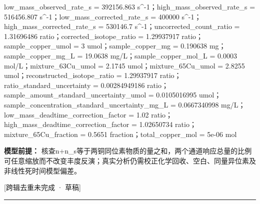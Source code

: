 \documentclass[UTF8,11pt,a4paper]{ctexart}
\begin{document}
low\_mass\_observed\_rate\_s = 392156.863 s\textasciicircum{}-1；high\_mass\_observed\_rate\_s = 516456.807 s\textasciicircum{}-1；low\_mass\_corrected\_rate\_s = 400000 s\textasciicircum{}-1；high\_mass\_corrected\_rate\_s = 530146.7 s\textasciicircum{}-1；uncorrected\_count\_ratio = 1.31696486 ratio；corrected\_isotope\_ratio = 1.29937917 ratio；sample\_copper\_umol = 3 umol；sample\_copper\_mg = 0.190638 mg；sample\_copper\_mg\_L = 19.0638 mg/L；sample\_copper\_mol\_L = 0.0003 mol/L；mixture\_63Cu\_umol = 2.1745 umol；mixture\_65Cu\_umol = 2.8255 umol；reconstructed\_isotope\_ratio = 1.29937917 ratio；ratio\_standard\_uncertainty = 0.00284949186 ratio；sample\_amount\_standard\_uncertainty\_umol = 0.0105016995 umol；sample\_concentration\_standard\_uncertainty\_mg\_L = 0.0667340998 mg/L；low\_mass\_deadtime\_correction\_factor = 1.02 ratio；high\_mass\_deadtime\_correction\_factor = 1.02650734 ratio；mixture\_65Cu\_fraction = 0.5651 fraction；total\_copper\_mol = 5e-06 mol\par
\noindent\textbf{模型前提：}
核查n+n\_s等于两铜同位素物质的量之和，两个通道响应总量的比例可任意缩放而不改变丰度反演；真实分析仍需校正化学回收、空白、同量异位素及非线性死时间模型偏差。\par
\noindent\textcolor{red!65!black}{[跨辑去重未完成 · 草稿]} \par
\medskip\hrule\medskip
{}
\end{document}
